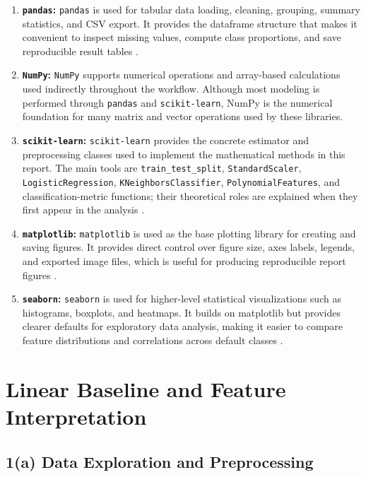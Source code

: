 \documentclass[12pt]{article}
\begin{document}
\begin{enumerate}[label=(\roman*)]
    \item \textbf{\texttt{pandas}:} \texttt{pandas} is used for tabular data loading, cleaning, grouping, summary statistics, and CSV export. It provides the dataframe structure that makes it convenient to inspect missing values, compute class proportions, and save reproducible result tables \cite{pandas_docs}.
    \item \textbf{\texttt{NumPy}:} \texttt{NumPy} supports numerical operations and array-based calculations used indirectly throughout the workflow. Although most modeling is performed through \texttt{pandas} and \texttt{scikit-learn}, NumPy is the numerical foundation for many matrix and vector operations used by these libraries.
    \item \textbf{\texttt{scikit-learn}:} \texttt{scikit-learn} provides the concrete estimator and preprocessing classes used to implement the mathematical methods in this report. The main tools are \texttt{train\_test\_split}, \texttt{StandardScaler}, \texttt{LogisticRegression}, \texttt{KNeighborsClassifier}, \texttt{PolynomialFeatures}, and classification-metric functions; their theoretical roles are explained when they first appear in the analysis \cite{sklearn_docs,sklearn_paper}.
    \item \textbf{\texttt{matplotlib}:} \texttt{matplotlib} is used as the base plotting library for creating and saving figures. It provides direct control over figure size, axes labels, legends, and exported image files, which is useful for producing reproducible report figures \cite{matplotlib_docs}.
    \item \textbf{\texttt{seaborn}:} \texttt{seaborn} is used for higher-level statistical visualizations such as histograms, boxplots, and heatmaps. It builds on matplotlib but provides clearer defaults for exploratory data analysis, making it easier to compare feature distributions and correlations across default classes \cite{seaborn_docs}.
\end{enumerate}

\section{Linear Baseline and Feature Interpretation}

\subsection{1(a) Data Exploration and Preprocessing}
\end{document}
